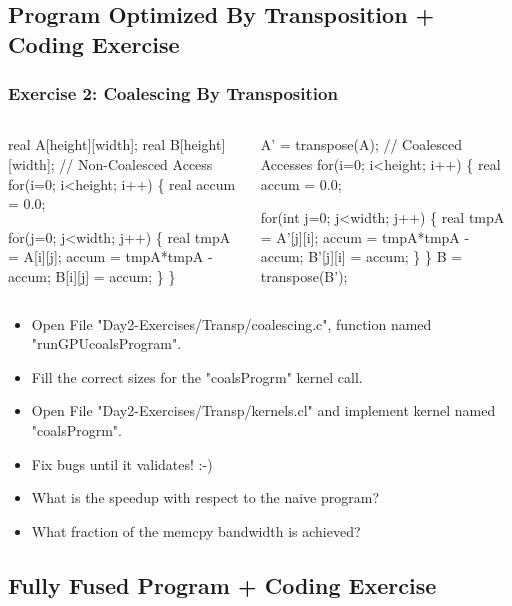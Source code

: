 \documentclass{beamer}
\renewcommand{\emph}[1]{\textcolor{CosGreen}{ #1}}
\newcommand{\emp}[1]{\textcolor{DikuRed}{ #1}}
\begin{document}
\subsection{Program Optimized By Transposition + Coding Exercise}

\begin{frame}[fragile,t]
  \frametitle{Exercise 2: Coalescing By Transposition} 

\begin{columns}
\begin{colorcode}[fontsize=\scriptsize]
real A[height][width];
real B[height][width];
// Non-Coalesced Access
\emph{for(i=0; i<height; i++) \{}
  real accum  = 0.0;

  \emp{for(j=0; j<width; j++) \{}
    real tmpA = A[i][j];
    accum = tmpA*tmpA - accum;
    B[i][j] = accum;
\} \}\pause
\end{colorcode}
\begin{colorcode}[fontsize=\scriptsize]
A' = transpose(A);
// Coalesced Accesses
\emph{for(i=0; i<height; i++) \{}
  real accum = 0.0;

  \emp{for(int j=0; j<width; j++) \{}
    real tmpA = A'[j][i];
    accum = tmpA*tmpA - accum;
    B'[j][i] = accum;
\} \}
B = transpose(B');
\end{colorcode}
\end{columns}
\bigskip

\begin{itemize}
    \item Open File "Day2-Exercises/Transp/coalescing.c", function named "runGPUcoalsProgram".
    \item Fill the correct sizes for the "coalsProgrm" kernel call.
    \item Open File "Day2-Exercises/Transp/kernels.cl" and implement kernel named "coalsProgrm".
    \item Fix bugs until it validates! :-)
    \item What is the speedup with respect to the naive program?
    \item What fraction of the memcpy bandwidth is achieved? 
\end{itemize}


\end{frame}

\subsection{Fully Fused Program + Coding Exercise}
\end{document}

